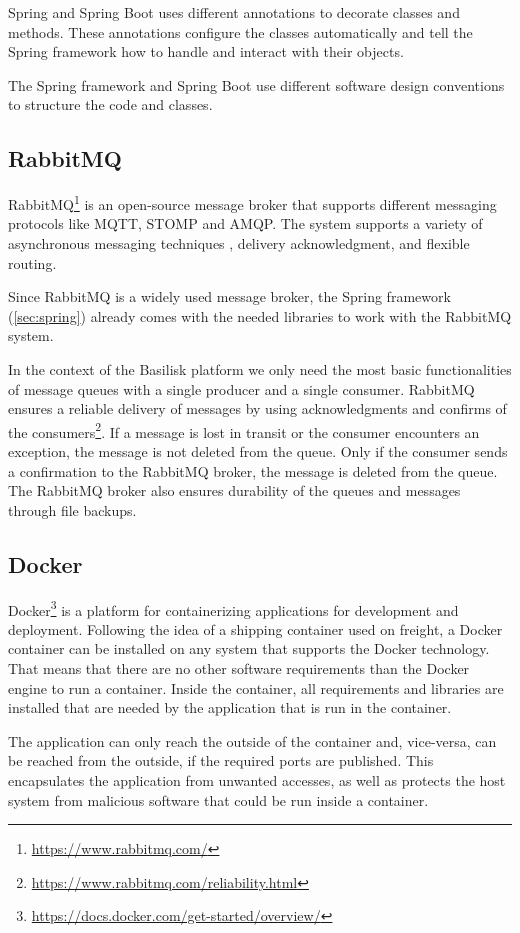 Spring and Spring Boot uses different annotations to decorate classes and methods.
These annotations configure the classes automatically and tell the Spring framework how to handle and interact with their objects.

The Spring framework and Spring Boot use different software design conventions to structure the code and classes.


\subsection{RabbitMQ}
\label{sec:rabbitmq}
RabbitMQ\footnote{\url{https://www.rabbitmq.com/}} is an open-source message broker that supports different messaging protocols like MQTT, STOMP and AMQP.
The system supports a variety of asynchronous messaging techniques \eg, delivery acknowledgment, and flexible routing.

Since RabbitMQ is a widely used message broker, the Spring framework (\ref{sec:spring}) already comes with the needed libraries to work with the RabbitMQ system.

In the context of the Basilisk platform we only need the most basic functionalities of message queues with a single producer and a single consumer.
RabbitMQ ensures a reliable delivery of messages by using acknowledgments and confirms of the consumers\footnote{\url{https://www.rabbitmq.com/reliability.html}}.
If a message is lost in transit or the consumer encounters an exception, the message is not deleted from the queue.
Only if the consumer sends a confirmation to the RabbitMQ broker, the message is deleted from the queue.
The RabbitMQ broker also ensures durability of the queues and messages through file backups.




\subsection{Docker}
Docker\footnote{\url{https://docs.docker.com/get-started/overview/}} is a platform for containerizing applications for development and deployment.
Following the idea of a shipping container used on freight, a Docker container can be installed on any system that supports the Docker technology.
That means that there are no other software requirements than the Docker engine to run a container.
Inside the container, all requirements and libraries are installed that are needed by the application that is run in the container.

The application can only reach the outside of the container and, vice-versa, can be reached from the outside, if the required ports are published.
This encapsulates the application from unwanted accesses, as well as protects the host system from malicious software that could be run inside a container.
\\

